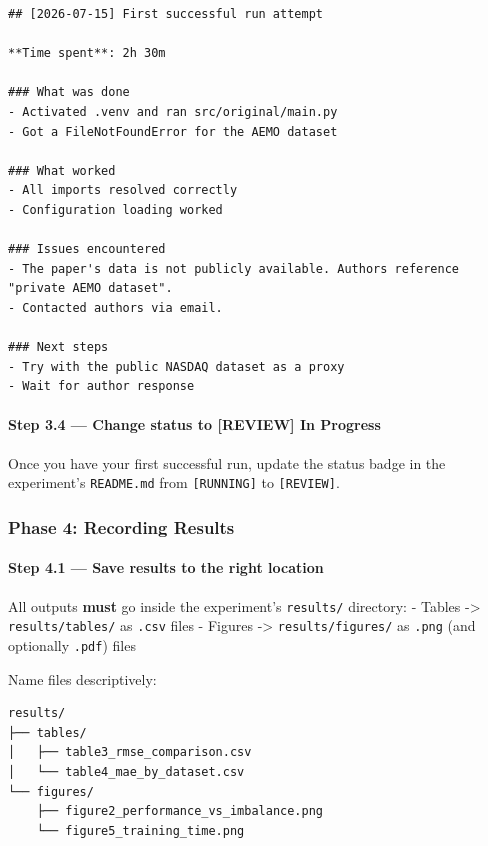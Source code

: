 \begin{verbatim}
## [2026-07-15] First successful run attempt

**Time spent**: 2h 30m

### What was done
- Activated .venv and ran src/original/main.py
- Got a FileNotFoundError for the AEMO dataset

### What worked
- All imports resolved correctly
- Configuration loading worked

### Issues encountered
- The paper's data is not publicly available. Authors reference "private AEMO dataset".
- Contacted authors via email.

### Next steps
- Try with the public NASDAQ dataset as a proxy
- Wait for author response
\end{verbatim}

\paragraph{Step 3.4 --- Change status to {[}REVIEW{]} In
Progress}\label{step-3.4-change-status-to-review-in-progress}

Once you have your first successful run, update the status badge in the
experiment's \texttt{README.md} from
\texttt{[RUNNING]} to
\texttt{[REVIEW]}.

\subsubsection{Phase 4: Recording
Results}\label{phase-4-recording-results}

\paragraph{Step 4.1 --- Save results to the right
location}\label{step-4.1-save-results-to-the-right-location}

All outputs \textbf{must} go inside the experiment's
\texttt{results/} directory: - Tables -\textgreater{}
\texttt{results/tables/} as
\texttt{.csv} files - Figures -\textgreater{}
\texttt{results/figures/} as
\texttt{.png} (and optionally
\texttt{.pdf}) files

Name files descriptively:

\begin{verbatim}
results/
├── tables/
│   ├── table3_rmse_comparison.csv
│   └── table4_mae_by_dataset.csv
└── figures/
    ├── figure2_performance_vs_imbalance.png
    └── figure5_training_time.png
\end{verbatim}

